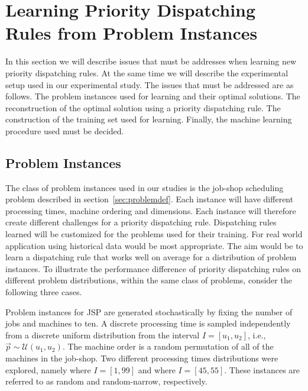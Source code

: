 \documentclass[smallextended]{svjour3}
\begin{document}
\section{Learning Priority Dispatching Rules from Problem Instances}\label{sec:gentrainingdata}

In this section we will describe issues that must be addresses when learning new priority dispatching rules. At the same time we will describe the experimental setup used in our experimental study. The issues that must be addressed are as follows. The problem instances used for learning and their optimal solutions. The reconstruction of the optimal solution using a priority dispatching rule. The construction of the training set used for learning. Finally, the
machine learning procedure used must be decided.


\subsection*{Problem Instances}\label{sec:data:sim}

The class of problem instances used in our studies is the job-shop scheduling problem described in section~\ref{sec:problemdef}. Each instance will have different processing times, machine ordering and dimensions. Each instance will therefore create different challenges for a priority dispatching rule. Dispatching rules learned will be customized for the problems used for their training. For real world application using historical data would be most appropriate. The aim would be to learn a dispatching rule that works well on average for a distribution of problem instances. To illustrate the performance difference of priority dispatching rules on different problem distributions, within the same class of problems, consider the following three cases.

Problem instances for JSP are generated stochastically by fixing the number of 
jobs and machines to ten. A discrete processing time is sampled independently from a 
discrete uniform distribution from the interval $I=[u_1,u_2]$, i.e., 
$\vec{p}\sim \mathcal{U}(u_1,u_2)$. 
The machine order is a random permutation of all of the machines in the 
job-shop. Two different processing times distributions were explored, namely   
where $I=[1,99]$ and  where $I=[45,55]$. These instances 
are referred to as random and random-narrow, respectively. 
\end{document}

